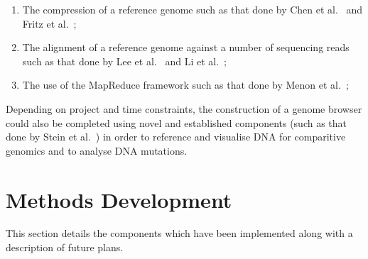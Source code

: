 \documentclass{csfyp}
\begin{document}
\begin{enumerate}[nolistsep]

   \item The compression of a reference genome such as that done by Chen et al.~\cite{gencompress} and Fritz et al.~\cite{refcompression};

  \item The alignment of a reference genome against a number of sequencing reads such as that done by Lee et al.~\cite{cgreads} and Li et al.~\cite{bwtransform};

  \item The use of the MapReduce framework such as that done by Menon et al.~\cite{mapredgen};

\end{enumerate}

Depending on project and time constraints, the construction of a genome browser could also be completed using novel and established components (such as that done by Stein et al.~\cite{genericbrowser}) in order to reference and visualise DNA for comparitive genomics and to analyse DNA mutations.


\section{Methods Development}\vspace{-2ex}

This section details the components which have been implemented along with a description of future plans.
\end{document}
